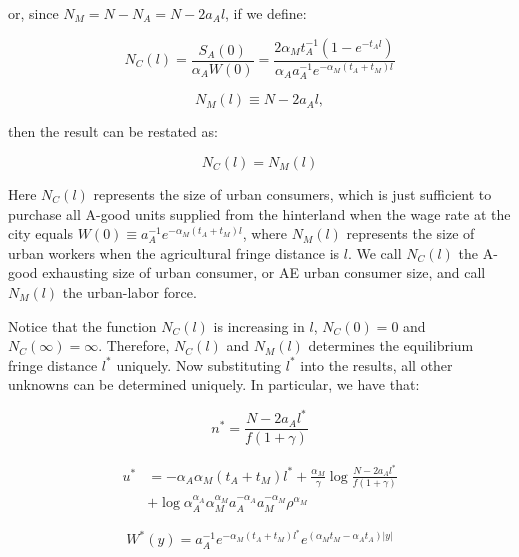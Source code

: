or, since $N_M = N - N_A = N - 2 a_A l$, if we define:

\begin{equation}
  N_C(l) = \frac{S_A(0)}{\alpha_A W(0)} = \frac{2\alpha_M t_A^{-1}(1 - e^{-t_A l})}{\alpha_A a_A^{-1} e^{-\alpha_M (t_A + t_M)l}}
\end{equation}

\begin{equation}
  N_M(l) \equiv N - 2a_A l,
\end{equation}

then the result can be restated as:

\begin{equation}
  N_C(l) = N_M(l)
\end{equation}

Here $N_C(l)$ represents the size of urban consumers, which is just sufficient to purchase all A-good units supplied from the hinterland when the wage rate at the city equals $W(0) \equiv a_A^{-1} e^{-\alpha_M (t_A + t_M)l}$, where $N_M(l)$ represents the size of urban workers when the agricultural fringe distance is $l$. We call $N_C(l)$ the A-good exhausting size of urban consumer, or AE urban consumer size, and call $N_M(l)$ the urban-labor force.

Notice that the function $N_C(l)$ is increasing in $l$, $N_C(0) = 0$ and $N_C(\infty) = \infty$. Therefore, $N_C(l)$ and $N_M(l)$ determines the equilibrium fringe distance $l^*$ uniquely. Now substituting $l^*$ into the results, all other unknowns can be determined uniquely. In particular, we have that:

\begin{equation}
  n^* = \frac{N - 2a_A l^*}{f(1 + \gamma)}
\end{equation}

\begin{equation}
\begin{aligned}
  u^* & = -\alpha_A \alpha_M (t_A + t_M)l^* + \frac{\alpha_M}{\gamma} \log \frac{N - 2a_A l^*}{f(1 + \gamma)} \\
      & + \log \alpha_A^{\alpha_A} \alpha_M^{\alpha_M} a_A^{-\alpha_A} a_M^{-\alpha_M} \rho^{\alpha_M}
\end{aligned}
\end{equation}

\begin{equation}
  W^*(y) = a_A^{-1} e^{-\alpha_M (t_A + t_M)l^*} e^{(\alpha_M t_M - \alpha_A t_A)|y|}
\end{equation}

